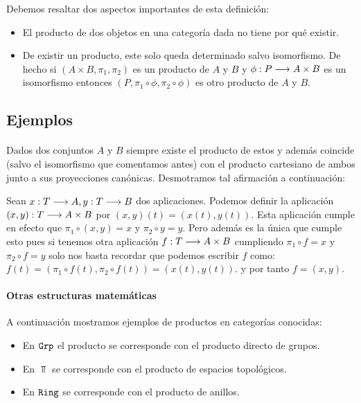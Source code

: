 Debemos resaltar dos aspectos importantes de esta definición:
\begin{itemize}
\item El producto de dos objetos en una categoría dada no tiene por qué
      existir.
\item De existir un producto, este solo queda determinado salvo isomorfismo. De hecho si $(A\times B, \pi_1, \pi_2)$ es un producto de $A$ y $B$
y $\phi : P\longrightarrow A\times B$ es un isomorfismo entonces
$(P, \pi_1 \circ \phi , \pi_2 \circ \phi)$ es otro producto de $A$
y $B$.
\end{itemize}


\subsection{Ejemplos}
\paragraph{\Set}
Dados dos conjuntos $A$ y $B$ siempre existe el producto de estos
y además coincide (salvo el isomorfismo
que comentamos antes) con el producto cartesiano de ambos
junto a sus proyecciones canónicas. Desmotramos tal
afirmación a continuación:

Sean $x: T\longrightarrow A, y: T\longrightarrow B$ dos aplicaciones. Podemos
definir la aplicación $(x, y) :T\longrightarrow A\times B$ por
$(x, y)(t) = (x(t), y(t))$. Esta aplicación cumple en efecto que
$\pi_1 \circ (x, y) = x$ y $\pi_2 \circ y = y$. Pero además es la única
que cumple esto pues si tenemos otra aplicación
$f : T\longrightarrow A\times B$ cumpliendo $\pi_1 \circ f = x$ y
$\pi_2 \circ f = y$ solo nos basta recordar que podemos
escribir $f$ como:
$f(t)=(\pi_1\circ f(t), \pi_2\circ f(t))=(x(t), y(t))$.
y por tanto $f = (x, y)$.

\paragraph{Otras estructuras matemáticas}
A continuación mostramos ejemplos de productos
en categorías conocidas:

\begin{itemize}
\item En $\texttt{Grp}$ el producto se corresponde con el
producto directo de grupos.
\item En $\Top$ se corresponde con el producto de espacios topológicos.
\item En $\texttt{Ring}$ se corresponde con el producto de anillos.
\end{itemize}

